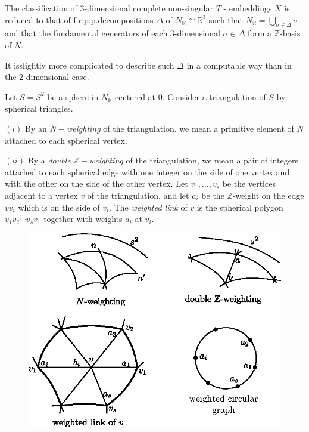 The classification of 3-dimensional complete non-singular
$T$ - embeddings $X$ is reduced to that  of f.r.p.p.decompositions
$\Delta$ of $N_\mathbb{R} \cong \mathbb{R}^3$ such that $N_\mathbb{R}
= \bigcup \limits_{\sigma \in \Delta} \sigma$ and that the fundamental
generators of each  3-dimensional $\sigma \in \Delta$ form  a
$\mathbb{Z}$-basis of $N$. 

It is\pageoriginale slightly more complicated to describe such
$\Delta$ in a computable way than in the 2-dimensional case.  

\begin{defi*}
Let $S = S^2$ be a sphere in $N_\mathbb{R}$ centered at 0. Consider
a triangulation of $S$ by spherical triangles. 
\end{defi*}

\noindent
$(i)$ By an $N-$\textit{weighting} of the triangulation. we mean a
primitive element of $N$ attached to each spherical vertex. 

\noindent
$(ii)$ By a \textit{double} $\mathbb{Z}-$\textit{weighting} of the
triangulation, we mean a pair of integers attached to each spherical
edge with one integer on the side of one vertex and with the other on
the  side of the other vertex. Let $v_1, \ldots , v_s$ be the
vertices adjacent to a vertex $v$ of the triangulation, and let $a_i$
be the $\mathbb{Z}$-weight on the edge $vv_i$ which is on the side of
$v_i$. The \textit{weighted link} of $v$ is the spherical polygon
$v_1v_2\cdots v_s v_1$ together  with weights $a_i $ at $v_i$. 
\begin{figure}[H]
\centering 
\includegraphics{vol58-fig/fig58-20.eps} 
\end{figure}

